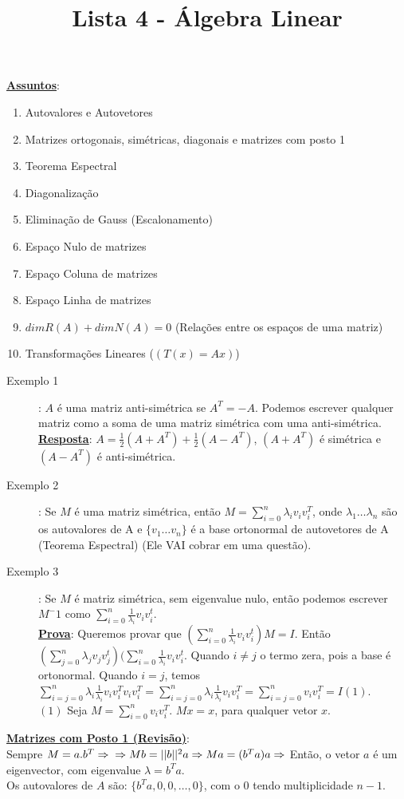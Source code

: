 \documentclass[12pt]{article}
\title{Lista 4 - Álgebra Linear}
\author{}
\date{}
\newcommand{\gsum}[3]{\displaystyle\sum_{#1}^#2 #3}
\newcommand{\mytitle}[1]{\textbf{\underline{#1}}}
\begin{document}
\maketitle
\mytitle{Assuntos}:
\begin{enumerate}
\item Autovalores e Autovetores
\item Matrizes ortogonais, simétricas, diagonais e matrizes com posto 1
\item Teorema Espectral
\item Diagonalização
\item Eliminação de Gauss (Escalonamento)
\item Espaço Nulo de matrizes
\item Espaço Coluna de matrizes
\item Espaço Linha de matrizes
\item $dimR(A)+dimN(A)=0$ (Relações entre os espaços de uma matriz)
\item Transformações Lineares ($(T(x)=Ax)$)
\end{enumerate}
\begin{description}
\item[Exemplo 1]: $A$ é uma matriz anti-simétrica se $A^T=-A$. Podemos escrever qualquer matriz como a soma de uma matriz simétrica com uma anti-simétrica.\\
  \mytitle{Resposta}: $A=\frac{1}{2}(A+A^T)+\frac{1}{2}(A-A^T)$, $(A+A^T)$ é simétrica e $(A-A^T)$ é anti-simétrica.
\item[Exemplo 2]: Se $M$ é uma matriz simétrica, então $M=\gsum{i=0}{n}{\lambda_i v_iv_i^T}$, onde $\lambda_1\dots\lambda_n$ são os autovalores de A e $\{v_1\dots v_n\}$ é a base ortonormal de autovetores de A (Teorema Espectral) (Ele VAI cobrar em uma questão).\\
\item[Exemplo 3]: Se $M$ é matriz simétrica, sem eigenvalue nulo, então podemos escrever $M^-1$ como $\gsum{i=0}{n}{\frac{1}{\lambda_i}v_iv_i^t}$.\\
  \mytitle{Prova}: Queremos provar que $(\gsum{i=0}{n}{\frac{1}{\lambda_i}v_iv_i^t})M=I$. Então $(\gsum{j=0}{n}{\lambda_jv_jv_j^t})(\gsum{i=0}{n}{\frac{1}{\lambda_i}v_iv_i^t}$. Quando $i\neq j$ o termo zera, pois a  base é ortonormal. Quando $i=j$, temos $\gsum{i=j=0}{n}{\lambda_i\frac{1}{\lambda_i}v_iv_i^Tv_iv_i^T}=\gsum{i=j=0}{n}{\lambda_i\frac{1}{\lambda_i}v_iv_i^T}=\gsum{i=j=0}{n}{v_iv_i^T}=I(1)$.\\
  $(1)$ Seja $M=\gsum{i=0}{n}{v_iv_i^T}$. $Mx=x$, para qualquer vetor $x$.
\end{description}
\mytitle{Matrizes com Posto 1 (Revisão)}:\\
Sempre $M=a.b^T\Rightarrow\\
\Rightarrow Mb=||b||^2a\\
\Rightarrow Ma=(b^Ta)a\Rightarrow$ Então, o vetor $a$ é um eigenvector, com eigenvalue $\lambda= b^Ta$.\\
Os autovalores de $A$ são: $\{b^Ta,0,0,\dots,0\}$, com o $0$ tendo multiplicidade $n-1$.
\end{document}
